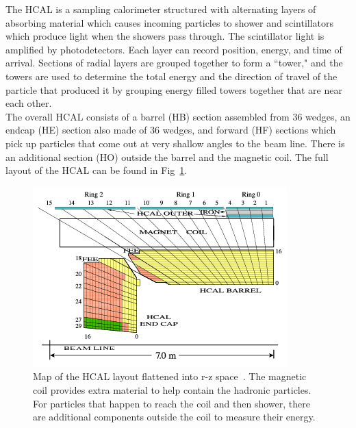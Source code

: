 	The HCAL is a sampling calorimeter structured with alternating layers of absorbing material  which causes incoming particles to shower and scintillators which produce light when the showers pass through. The scintillator light is amplified by photodetectors. Each layer can record position, energy, and time of arrival. Sections of radial layers are grouped together to form a ``tower," and the towers are used to determine the total energy and the direction of travel of the particle that produced it by grouping energy filled towers together that are near each other.\\
	
	The overall HCAL consists of a barrel (HB) section assembled from 36 wedges, an endcap (HE) section also made of 36 wedges, and forward (HF) sections which pick up particles that come out at very shallow angles to the beam line. There is an additional section (HO) outside the barrel and the magnetic coil. The full layout of the HCAL can be found in Fig~\ref{fig:hcal}.\\
	
						\begin{figure}[h]
\begin{center}
\includegraphics[width=0.9\linewidth]{Figs/HCAL_layout.png}
\caption{\label{fig:hcal}
Map of the HCAL layout flattened into r-z space~\cite{hcalperformance}. The magnetic coil provides extra material to help contain the hadronic particles. For particles that happen to reach the coil and then shower, there are additional components outside the coil to measure their energy.
}
\end{center}
\end{figure}

